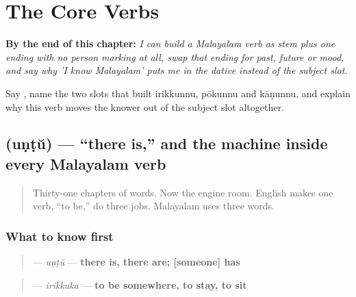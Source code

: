 
\chapter{The Core Verbs}
\label{ch:ml-core-verbs}

\begin{chapteropening}
\textbf{By the end of this chapter:} \emph{I can build a Malayalam verb as stem plus one ending with no person marking at all, swap that ending for past, future or mood, and say why 'I know Malayalam' puts me in the dative instead of the subject slot.}

Say   , name the two slots that built irikkunnu, pōkunnu and kāṇunnu, and explain why this verb moves the knower out of the subject slot altogether.
\end{chapteropening}

\section[\texorpdfstring{\ml{ഉണ്ട്} (uṇṭŭ)}{ഉണ്ട് (uṇṭŭ)}]{ (uṇṭŭ) — \textquotedblleft{}there is,\textquotedblright{} and the machine inside every Malayalam verb}

\label{lesson:ML-C32-undu}



\begin{quote}
Thirty-one chapters of words. Now the engine room. English makes one verb, \textquotedblleft{}to be,\textquotedblright{} do three jobs. Malayalam uses three words.
\end{quote}

\subsection*{What to know first}
\begin{quote}
\textbf{} — \emph{uṇṭŭ} — \textbf{there is, there are; {[}someone{]} has}
\end{quote}

\begin{quote}
\textbf{} — \emph{irikkuka} — \textbf{to be somewhere, to stay, to sit}
\end{quote}

